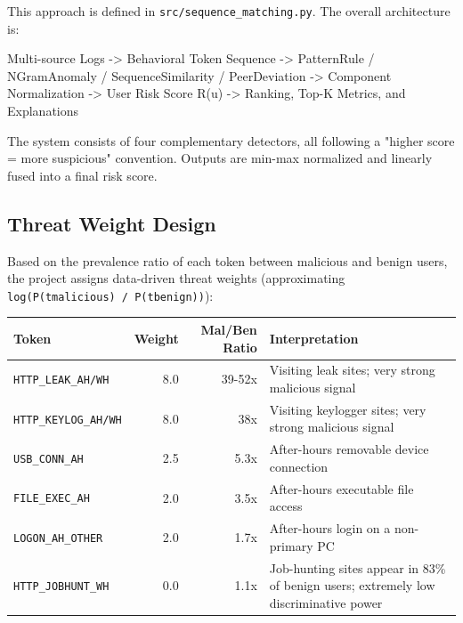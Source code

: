 \documentclass[
  a4paper,
  11pt]{article}
\newenvironment{Shaded}{}{}
\newcommand{\NormalTok}[1]{#1}
\newcounter{none} %
\begin{document}
This approach is defined in \texttt{src/sequence\_matching.py}. The
overall architecture is:

\begin{Shaded}
\begin{Highlighting}[]
\NormalTok{Multi{-}source Logs}
\NormalTok{  {-}\textgreater{} Behavioral Token Sequence}
\NormalTok{  {-}\textgreater{} PatternRule / NGramAnomaly / SequenceSimilarity / PeerDeviation}
\NormalTok{  {-}\textgreater{} Component Normalization}
\NormalTok{  {-}\textgreater{} User Risk Score R(u)}
\NormalTok{  {-}\textgreater{} Ranking, Top{-}K Metrics, and Explanations}
\end{Highlighting}
\end{Shaded}

The system consists of four complementary detectors, all following a
"higher score = more suspicious" convention. Outputs are min-max
normalized and linearly fused into a final risk score.

\subsection{Threat Weight Design}\label{threat-weight-design}

Based on the prevalence ratio of each token between malicious and benign
users, the project assigns data-driven threat weights (approximating
\texttt{log(P(t\textbar{}malicious)\ /\ P(t\textbar{}benign))}):

{\def\LTcaptype{none} %
\begin{longtable}[]{@{}L{0.25}R{0.10}R{0.13}L{0.44}@{}}
\toprule\noalign{}
Token & Weight & Mal/Ben Ratio & Interpretation \\
\midrule\noalign{}
\endhead
\bottomrule\noalign{}
\endlastfoot
\texttt{HTTP\_LEAK\_AH/WH} & 8.0 & 39-52x & Visiting leak sites; very
strong malicious signal \\
\texttt{HTTP\_KEYLOG\_AH/WH} & 8.0 & 38x & Visiting keylogger sites;
very strong malicious signal \\
\texttt{USB\_CONN\_AH} & 2.5 & 5.3x & After-hours removable device
connection \\
\texttt{FILE\_EXEC\_AH} & 2.0 & 3.5x & After-hours executable file
access \\
\texttt{LOGON\_AH\_OTHER} & 2.0 & 1.7x & After-hours login on a
non-primary PC \\
\texttt{HTTP\_JOBHUNT\_WH} & 0.0 & 1.1x & Job-hunting sites appear in
83\% of benign users; extremely low discriminative power \\
\end{longtable}
}
\end{document}
